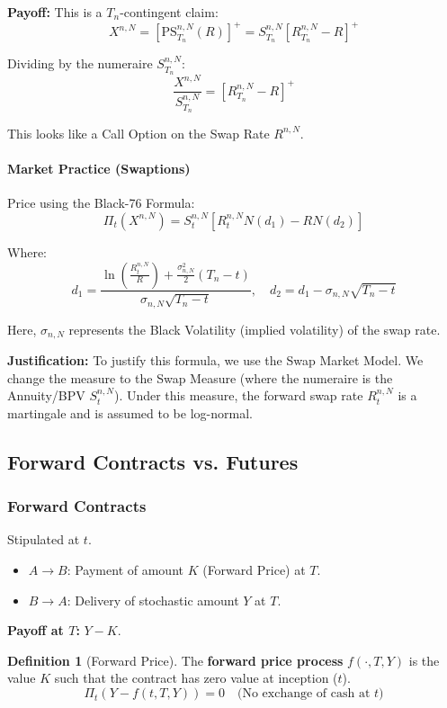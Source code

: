 \documentclass[12pt,a4paper]{article}
\theoremstyle{definition}
\newtheorem{definition}{Definition}[section]
\begin{document}
\textbf{Payoff:} This is a $T_n$-contingent claim:
\[
X^{n,N} = [\text{PS}_{T_n}^{n,N}(R)]^+ = S_{T_n}^{n,N}[R_{T_n}^{n,N} - R]^+
\]

Dividing by the numeraire $S_{T_n}^{n,N}$:
\[
\frac{X^{n,N}}{S_{T_n}^{n,N}} = [R_{T_n}^{n,N} - R]^+
\]

This looks like a Call Option on the Swap Rate $R^{n,N}$.

\paragraph{Market Practice (Swaptions)}

Price using the Black-76 Formula:
\[
\Pi_t(X^{n,N}) = S_t^{n,N}[R_t^{n,N}N(d_1) - RN(d_2)]
\]

Where:
\[
d_1 = \frac{\ln\left(\frac{R_t^{n,N}}{R}\right) + \frac{\sigma_{n,N}^2}{2}(T_n - t)}{\sigma_{n,N}\sqrt{T_n - t}}, \quad d_2 = d_1 - \sigma_{n,N}\sqrt{T_n - t}
\]

Here, $\sigma_{n,N}$ represents the Black Volatility (implied volatility) of the swap rate.

\textbf{Justification:} To justify this formula, we use the Swap Market Model. We change the measure to the Swap Measure (where the numeraire is the Annuity/BPV $S_t^{n,N}$). Under this measure, the forward swap rate $R_t^{n,N}$ is a martingale and is assumed to be log-normal.

\subsection{Forward Contracts vs. Futures}

\subsubsection{Forward Contracts}

Stipulated at $t$.

\begin{itemize}
\item $A \to B$: Payment of amount $K$ (Forward Price) at $T$.
\item $B \to A$: Delivery of stochastic amount $Y$ at $T$.
\end{itemize}

\textbf{Payoff at $T$:} $Y - K$.

\begin{definition}[Forward Price]
The \textbf{forward price process} $f(\cdot, T, Y)$ is the value $K$ such that the contract has zero value at inception ($t$).
\[
\Pi_t(Y - f(t, T, Y)) = 0 \quad \text{(No exchange of cash at } t\text{)}
\]
\end{definition}
\end{document}
